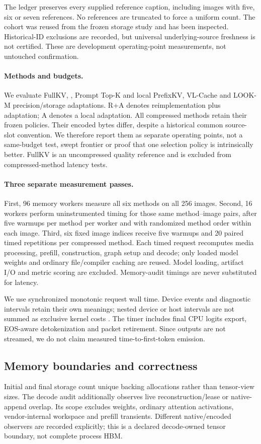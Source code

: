 The ledger preserves every supplied reference caption, including images
with five, six or seven references. No references are truncated to force a
uniform count. The cohort was reused from the frozen storage study and
has been inspected. Historical-ID exclusions are recorded, but universal
underlying-source freshness is not certified. These are development
operating-point measurements, not untouched confirmation.

\paragraph{Methods and budgets.}
We evaluate FullKV, \Evi{}, Prompt Top-K and local PrefixKV, VL-Cache and
LOOK-M precision/storage adaptations. R+A denotes reimplementation plus
adaptation; A denotes a local adaptation. All compressed methods retain
their frozen policies. Their encoded bytes differ, despite a historical
common source-slot convention. We therefore report them as separate
operating points, not a same-budget test, swept frontier or proof that one
selection policy is intrinsically better. FullKV is an uncompressed
quality reference and is excluded from compressed-method latency tests.

\paragraph{Three separate measurement passes.}
First, 96 memory workers measure all six methods on all 256 images.
Second, 16 workers perform uninstrumented timing for those same
method--image pairs, after five warmups per method per worker and with
randomized method order within each image. Third, six fixed image indices
receive five warmups and 20 paired timed repetitions per compressed
method. Each timed request recomputes media processing, prefill,
construction, graph setup and decode; only loaded model weights and
ordinary file/compiler caching are reused. Model loading, artifact I/O and
metric scoring are excluded. Memory-audit timings are never substituted
for latency.

We use synchronized monotonic request wall time. Device events and
diagnostic intervals retain their own meanings; nested device or host
intervals are not summed as exclusive kernel costs
\citep{pytorch2025cuda}. The timer includes final CPU logits export,
EOS-aware detokenization and packet retirement. Since outputs are not
streamed, we do not claim measured time-to-first-token emission.

\subsection{Memory boundaries and correctness}
\label{sec:memory}
Initial and final storage count unique backing allocations rather than
tensor-view sizes. The decode audit additionally observes live
reconstruction/lease or native-append overlap. Its scope excludes weights,
ordinary attention activations, vendor-internal workspace and prefill
transients. Different native/encoded observers are recorded explicitly;
this is a declared decode-owned tensor boundary, not complete process HBM.

